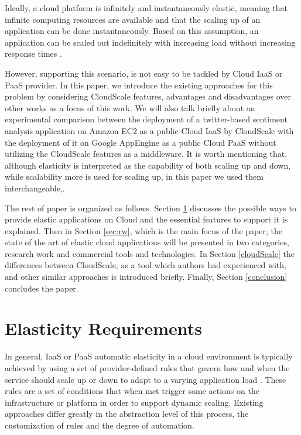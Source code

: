 \documentclass{sig-alternate}
\begin{document}
Ideally, a cloud platform is infinitely and instantaneously elastic, meaning that infinite computing resources are available and that the scaling up of an application can be done instantaneously. Based on this assumption, an application can be scaled out indefinitely with increasing load without increasing response times \cite{brebner2012your}. 

However, supporting this scenario, is not easy to be tackled by Cloud IaaS or PaaS provider. In this paper, we introduce the existing approaches for this problem by considering CloudScale \cite{leitner2012cloudscale} features, advantages and disadvantages over other works as a focus of this work. We will also talk briefly about an experimental comparison between the deployment of a twitter-based sentiment analysis application on Amazon EC2 as a public Cloud IaaS by CloudScale with the deployment of it on Google AppEngine as a public Cloud PaaS without utilizing the CloudScale features as a middleware. It is worth mentioning that, although elasticity is interpreted as the capability of both scaling up and down, while scalability more is used for scaling up, in this paper we used them interchangeable,.

The rest of paper is organized as follows. Section \ref{elasticity-req} discusses the possible ways to provide elastic applications on Cloud and the essential features to support it is explained. Then in Section \ref{sec:rw}, which is the main focus of the paper, the state of the art of elastic cloud applications will be presented in two categories, research work and commercial tools and technologies. In Section \ref{cloudScale} the differences between CloudScale, as a tool which authors had experienced with, and other similar approaches is introduced briefly. Finally, Section \ref{conclusion} concludes the paper.

\section{Elasticity Requirements} \label{elasticity-req}
In general, IaaS or PaaS automatic elasticity in a cloud environment is typically achieved by using a set of provider-defined rules that govern how and when the service should scale up or down to adapt to a varying application load \cite{vaquero2011dynamically}. These rules are a set of conditions that when met trigger some actions on the infrastructure or platform in order to support dynamic scaling. Existing approaches differ greatly in the abstraction level of this process, the customization of rules and the degree of automation.
\end{document}

